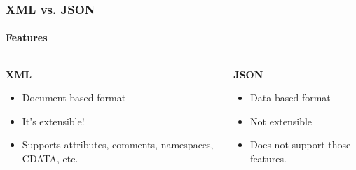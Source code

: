 \documentclass[
    alternativetitlepage=alternativ,
    cornerlogo=hgi_nds_logo2,
    sectionoverview,
]{rubpresentation}
\begin{document}
\begin{frame}
    \frametitle{XML vs. JSON}
    \framesubtitle{Features}
    \begin{columns}[t]
        \begin{column}{0.5\textwidth}
            \begin{center}\textbf{\Large XML}\end{center}
            \begin{itemize}
                \item{} Document based format\\
                \item{} It's extensible!\\
                \item{} Supports attributes, comments, namespaces, CDATA, etc.
            \end{itemize}
        \end{column}
        \begin{column}{0.5\textwidth}
            \begin{center}\textbf{\Large JSON}\end{center}
            \begin{itemize}
                \item{} Data based format\\
                \item{} Not extensible\\
                \item{} Does not support those features.
            \end{itemize}
        \end{column}
    \end{columns}
\end{frame}
\end{document}
